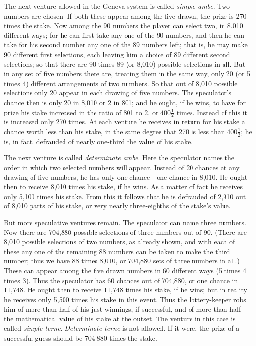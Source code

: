\documentclass[letterpaper,12pt,oneside,openany]{memoir}
\begin{document}
The next venture allowed in the Geneva system is
called \textit{simple ambe}. Two numbers are chosen. If both
these appear among the five drawn, the prize is 270
times the stake. Now among the 90 numbers the
player can select two, in 8,010 different ways; for he
can first take any one of the 90 numbers, and then he can
take for his second number any one of the 89 numbers
left; that is, he may make 90 different first selections,
each leaving him a choice of 89 different second selections;
so that there are 90 times 89 (or 8,010) possible
selections in all. But in any set of five numbers there
are, treating them in the same way, only 20 (or 5 times
4) different arrangements of two numbers. So that
out of 8,010 possible selections only 20 appear in each
drawing of five numbers. The speculator's chance then
is only 20 in 8,010 or 2 in 801; and he ought, if he
wins, to have for prize his stake increased in the ratio
of 801 to 2, or $400\frac{1}{2}$ times. Instead of this it is increased
only 270 times. At each venture he receives
in return for his stake a chance worth less than his
stake, in the same degree that 270 is less than $400\frac{1}{2}$;
he is, in fact, defrauded of nearly one-third the value of
his stake.

The next venture is called \textit{determinate ambe}. Here
the speculator names the order in which two selected
numbers will appear. Instead of 20 chances at any
drawing of five numbers, he has only one chance---one
chance in 8,010. He ought then to receive 8,010 times
his stake, if he wins. As a matter of fact he receives
only 5,100 times his stake. From this it follows that
he is defrauded of 2,910 out of 8,010 parts of his stake,
or very nearly three-eighths of the stake's value.

But more speculative ventures remain. The speculator
can name three numbers. Now there are 704,880
possible selections of three numbers out of 90. (There
are 8,010 possible selections of two numbers, as already
shown, and with each of these any one of the remaining
88 numbers can be taken to make the third number;
thus we have 88 times 8,010, or 704,880 sets of three
numbers in all.) These can appear among the five
drawn numbers in 60 different ways (5 times 4 times
3). Thus the speculator has 60 chances out of 704,880,
or one chance in 11,748. He ought then to receive
11,748 times his stake, if he wins; but in reality he
receives only 5,500 times his stake in this event. Thus
the lottery-keeper robs him of more than half of his just
winnings, if successful, and of more than half the mathematical
value of his stake at the outset. The venture
in this case is called \textit{simple terne}. \textit{Determinate terne}
is not allowed. If it were, the prize of a successful
guess should be 704,880 times the stake.
\end{document}
